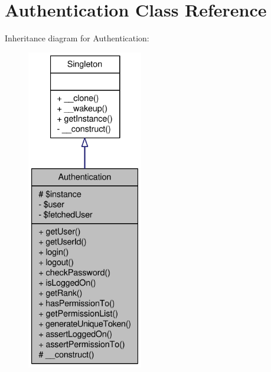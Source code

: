 \hypertarget{classAuthentication}{
\section{Authentication Class Reference}
\label{classAuthentication}
}


Inheritance diagram for Authentication:\nopagebreak
\begin{figure}[H]
\begin{center}
\leavevmode
\includegraphics[height=400pt]{classAuthentication__inherit__graph}
\end{center}
\end{figure}


